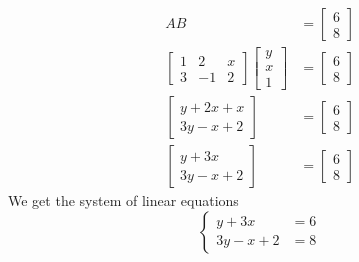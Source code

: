 \begin{example}
\begin{enumerate}
            \begin{align*}
                AB &= \begin{bmatrix}
                    6 \\ 8
                \end{bmatrix} \\
                \begin{bmatrix}
                    1 & 2 & x \\ 3 & -1 & 2
                \end{bmatrix}\begin{bmatrix}
                    y \\ x \\ 1
                \end{bmatrix} &= \begin{bmatrix}
                    6 \\ 8
                \end{bmatrix} \\
                \begin{bmatrix}
                    y + 2x + x \\ 3y - x + 2
                \end{bmatrix} &= \begin{bmatrix}
                    6 \\ 8
                \end{bmatrix} \\
                \begin{bmatrix}
                    y + 3x \\ 3y - x + 2
                \end{bmatrix} &= \begin{bmatrix}
                    6 \\ 8
                \end{bmatrix}
            \end{align*}
            We get the system of linear equations
            \[\begin{cases}
                y + 3x &= 6 \\
                3y - x + 2 &= 8
            \end{cases}\]


\end{enumerate}
\end{example}
